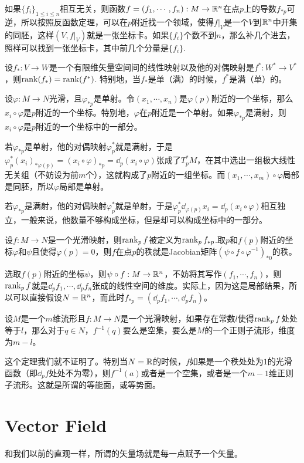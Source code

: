 如果$\{f_i\}_{1\leq i\leq n}$相互无关，则函数$f=(f_1,\cdots,f_n):M\to \mathbb{R}^n$在点$p$上的导数$f_{*p}$可逆，所以按照反函数定理，可以在$p$附近找一个领域，使得$f|_V$是一个$V$到$\mathbb{R}^n$中开集的同胚，这样$(V,f|_V)$就是一张坐标卡。如果$\{f_i\}$个数不到$n$，那么补几个进去，照样可以找到一张坐标卡，其中前几个分量是$\{f_i\}$.

\lem 设$f_*:V\to W$是一个有限维矢量空间间的线性映射以及他的对偶映射是$f^*:W^*\to V^*$，则$\operatorname{rank}(f_*)=\operatorname{rank}(f^*)$. 特别地，当$f_*$是单（满）的时候，$f^*$是满（单）的。

\para 设$\varphi:M\to N$光滑，且$\varphi_{*p}$是单射。令$(x_1,\cdots,x_n)$是$\varphi(p)$附近的一个坐标，那么$x_i\circ\varphi$是$p$附近的一个坐标。特别地，$\varphi$在$p$附近是一个单射。如果$\varphi_{*p}$是满射，则$x_i\circ\varphi$是$p$附近的一个坐标中的一部分。

若$\varphi_{*p}$是单射，他的对偶映射$\varphi^*_p$就是满射，于是$\varphi^*_p(x_i)_{*\varphi(p)}=(x_i\circ\varphi)_{*p}=\dd_p(x_i\circ \varphi)$张成了$T_p^*M$，在其中选出一组极大线性无关组（不妨设为前$m$个），这就构成了$p$附近的一组坐标。而$(x_1,\cdots,x_m)\circ \varphi$局部是同胚，所以$\varphi$局部是单射。

若$\varphi_{*p}$是满射，他的对偶映射$\varphi^*_p$就是单射，于是$\varphi^*_p\dd_{\varphi(p)}x_i=\dd_p(x_i\circ \varphi)$相互独立，一般来说，他数量不够构成坐标，但是却可以构成坐标中的一部分。

\para 设$f:M\to N$是一个光滑映射，则$\operatorname{rank}_p f$被定义为$\operatorname{rank}_p f_{*p}$.取$p$和$f(p)$附近的坐标$\varphi$和$\psi$且使得$\varphi(p)=0$，则$f$在点$p$的秩就是Jacobian矩阵$(\psi\circ f \circ \varphi^{-1})_{*0}$的秩。

选取$f(p)$附近的坐标$\psi$，则$\psi\circ f:M\to \mathbb{R}^n$，不妨将其写作$(f_1,\cdots,f_n)$，则$\operatorname{rank}_p f$就是${\dd_pf_1,\cdots,\dd_pf_n}$张成的线性空间的维度。实际上，因为这是局部结果，所以可以直接假设$N=\mathbb{R}^n$，而此时$f_{*p}=(\dd_pf_1,\cdots,\dd_pf_n)$。

\theo 设$M$是一个$m$维流形且$f:M\to N$是一个光滑映射，如果存在常数$l$使得$\operatorname{rank}_p f$处处等于$l$，那么对于$q\in N$，$f^{-1}(q)$要么是空集，要么是$M$的一个正则子流形，维度为$m-l$。

这个定理我们就不证明了。特别当$N=\mathbb{R}$的时候，$f$如果是一个秩处处为$1$的光滑函数（即$\dd_p f$处处不为零），则$f^{-1}(a)$或者是一个空集，或者是一个$m-1$维正则子流形。这就是所谓的等能面，或等势面。

\section{Vector Field}
和我们以前的直观一样，所谓的矢量场就是每一点赋予一个矢量。

